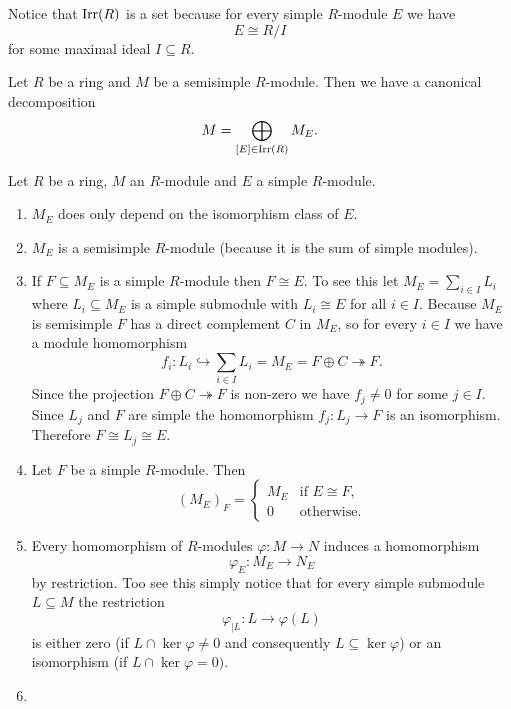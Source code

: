 Notice that $\operatorname{Irr}(R)$ is a set because for every simple $R$-module $E$ we have
\[
  E \cong R/I
\]
for some maximal ideal $I \subseteq R$.


\begin{cor}\label{cor: canonical decomposition semisimple module}
  Let $R$ be a ring and $M$ be a semisimple $R$-module. Then we have a canonical decomposition
  \[
    M = \bigoplus_{[E] \in \operatorname{Irr}(R)} M_E.
  \]
\end{cor}


\begin{rem}
    Let $R$ be a ring, $M$ an $R$-module and $E$ a simple $R$-module.
  \begin{enumerate}[label=\emph{\alph*)},leftmargin=*]
    \item
      $M_E$ does only depend on the isomorphism class of $E$.
    \item
      $M_E$ is a semisimple $R$-module (because it is the sum of simple modules).
    \item
      If $F \subseteq M_E$ is a simple $R$-module then $F \cong E$. To see this let $M_E = \sum_{i \in I} L_i$ where $L_i \subseteq M_E$ is a simple submodule with $L_i \cong E$ for all $i \in I$. Because $M_E$ is semisimple $F$ has a direct complement $C$ in $M_E$, so for every $i \in I$ we have a module homomorphism
      \[
        f_i \colon L_i \hookrightarrow \sum_{i \in I} L_i = M_E = F \oplus C \twoheadrightarrow F.
      \]
      Since the projection $F \oplus C \twoheadrightarrow F$ is non-zero we have $f_j \neq 0$ for some $j \in I$. Since $L_j$ and $F$ are simple the homomorphism $f_j \colon L_j \to F$ is an isomorphism. Therefore $F \cong L_j \cong E$.
    \item
      Let $F$ be a simple $R$-module. Then
      \[
        (M_E)_F =
        \begin{cases}
          M_E & \text{if } E \cong F, \\
              0 & \text{otherwise}.
        \end{cases}
      \]
    \item
      Every homomorphism of $R$-modules $\varphi \colon M \to N$ induces a homomorphism
      \[
        \varphi_E \colon M_E \to N_E
      \]
      by restriction. Too see this simply notice that for every simple submodule $L \subseteq M$ the restriction
      \[
        \varphi_{|L} \colon L \to \varphi(L)
      \]
      is either zero (if $L \cap \ker \varphi \neq 0$ and consequently $L \subseteq \ker \varphi$) or an isomorphism (if $L \cap \ker \varphi = 0)$.
    \item

\end{enumerate}
\end{rem}
